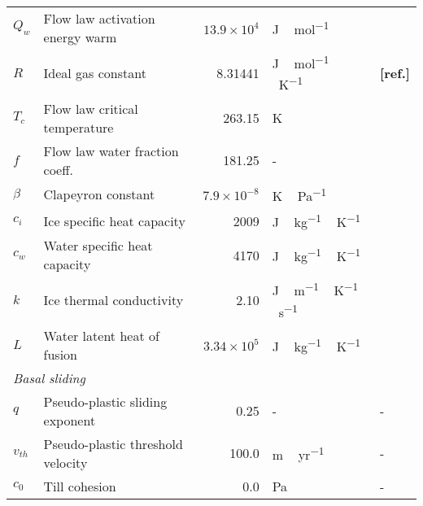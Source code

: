 \documentclass[tc, manuscript]{copernicus}
\newcommand{\aref}[0]{\textbf{[ref.]}}
\begin{document}
\begin{table*}
{\begin{tabular}{llrll}
    $Q_w$   & Flow law activation energy warm
            & $13.9\times10^4$
            & \unit{J\,mol^{-1}}
            & \citet{Paterson.Budd.1982} \\

    $R$     & Ideal gas constant
            & 8.31441
            & \unit{J\,mol^{-1}\,K^{-1}}
            & \aref \\

    $T_c$   & Flow law critical temperature
            & 263.15
            & \unit{K}
            & \citet{Paterson.Budd.1982} \\

    $f$     & Flow law water fraction coeff.
            & 181.25
            & -
            & \citet{Lliboutry.Duval.1985} \\

    $\beta$ & Clapeyron constant
            & $7.9\times10^{-8}$
            & \unit{K\,Pa^{-1}}
            & \citet{Luthi.etal.2002} \\

    $c_i$   & Ice specific heat capacity
            & 2009
            & \unit{J\,kg^{-1}\,K^{-1}}
            & \citet{Aschwanden.etal.2012} \\

    $c_w$   & Water specific heat capacity
            & 4170
            & \unit{J\,kg^{-1}\,K^{-1}}
            & \citet{Aschwanden.etal.2012} \\

    $k$     & Ice thermal conductivity
            & 2.10
            & \unit{J\,m^{-1}\,K^{-1}\,s^{-1}}
            & \citet{Aschwanden.etal.2012} \\

    $L$     & Water latent heat of fusion
            & $3.34\times10^5$
            & \unit{J\,kg^{-1}\,K^{-1}}
            & \citet{Aschwanden.etal.2012} \\

    \multicolumn{2}{l}{\emph{Basal sliding}} \\

    $q$     & Pseudo-plastic sliding exponent
            & 0.25
            & -
            & - \\

    $v_{th}$& Pseudo-plastic threshold velocity
            & 100.0
            & \unit{m\,yr^{-1}}
            & - \\

    $c_0$   & Till cohesion
            & 0.0
            & Pa
            & - \\


\end{tabular}}
\end{table*}
\end{document}
